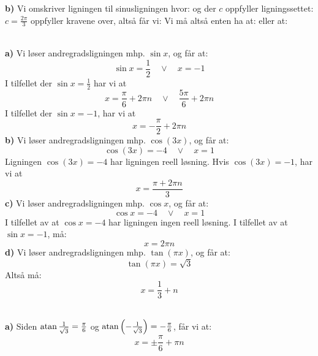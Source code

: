 \textbf{b)} Vi omskriver ligningen til sinusligningen
hvor:
og der $ c $ oppfyller ligningssettet:
$ c=\frac{2\pi}{3} $ oppfyller kravene over, altså får vi:
Vi må altså enten ha at:
eller at:

\\
\textbf{a)} Vi løser andregradsligningen mhp. $ \sin x $, og får at:
\[ \sin x = \frac{1}{2}\quad\vee\quad x= -1 \]
I tilfellet der $ {\sin x = \frac{1}{2}} $ har vi at
\[ x = \frac{\pi}{6}+2\pi n\quad\vee\quad \frac{5\pi}{6}+2\pi n \]
I tilfellet der $ {\sin x = -1} $, har vi at
\[ x = -\frac{\pi}{2}+2\pi n\]
\textbf{b)} Vi løser andregradsligningen mhp. $ \cos (3x) $, og får at:
\[ \cos (3x) = -4\quad\vee\quad x= 1 \]
Ligningen $ {\cos (3x) = -4} $ har ligningen reell løsning. Hvis $ {\cos (3x) = -1} $, har vi at
\[ x = \frac{\pi +2\pi n}{3}\]
\textbf{c)} Vi løser andregradsligningen mhp. $ \cos x $, og får at:
\[ \cos x = -4\quad\vee\quad x= 1 \]
I tilfellet av at $ {\cos x = -4} $ har ligningen ingen reell løsning. I tilfellet av at $ {\sin x = -1} $, må:
\[ x = 2\pi n\]
\textbf{d)} Vi løser andregradsligningen mhp. $ \tan(\pi x) $, og får at:
\[ \tan(\pi x) = \sqrt{3}\]
Altså må:
\[ x = \frac{1}{3}+n\]

\\
\textbf{a)} 
Siden $ {\operatorname{atan} \frac{1}{\sqrt{3}}=\frac{\pi}{6}} $ og $ {\operatorname{atan} \left(-\frac{1}{\sqrt{3}}\right)=-\frac{\pi}{6}} $, får vi at:
\[ x = \pm \frac{\pi}{6}+\pi n \]

